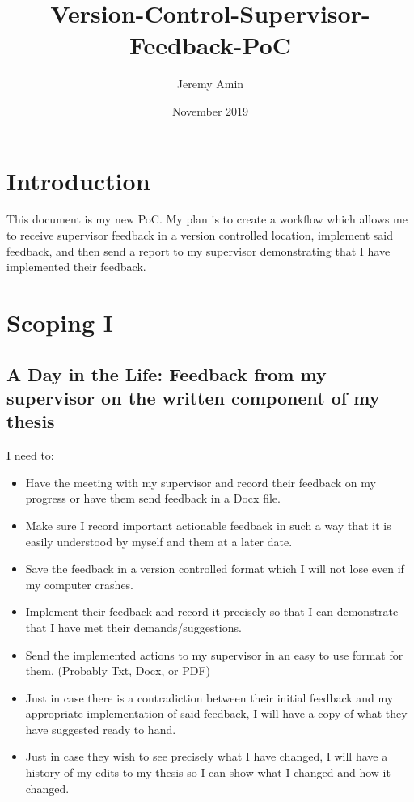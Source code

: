 \documentclass{article}
\title{Version-Control-Supervisor-Feedback-PoC}
\author{Jeremy Amin}
\date{November 2019}
\begin{document}
\maketitle
\tableofcontents

\pagebreak

\section{Introduction}

This document is my new PoC. My plan is to create a workflow which allows me to receive supervisor feedback in a version controlled location, implement said feedback, and then send a report to my supervisor demonstrating that I have implemented their feedback.

\section{Scoping I}

\subsection{A Day in the Life: Feedback from my supervisor on the written component of my thesis}

I need to:
\begin{itemize}
    \item Have the meeting with my supervisor and record their feedback on my progress or have them send feedback in a Docx file.
    \item Make sure I record important actionable feedback in such a way that it is easily understood by myself and them at a later date.
    \item Save the feedback in a version controlled format which I will not lose even if my computer crashes.
    \item Implement their feedback and record it precisely so that I can demonstrate that I have met their demands/suggestions.
    \item Send the implemented actions to my supervisor in an easy to use format for them. (Probably Txt, Docx, or PDF)
    \item Just in case there is a contradiction between their initial feedback and my appropriate implementation of said feedback, I will have a copy of what they have suggested ready to hand.
    \item Just in case they wish to see precisely what I have changed, I will have a history of my edits to my thesis so I can show what I changed and how it changed.
\end{itemize}
\end{document}

